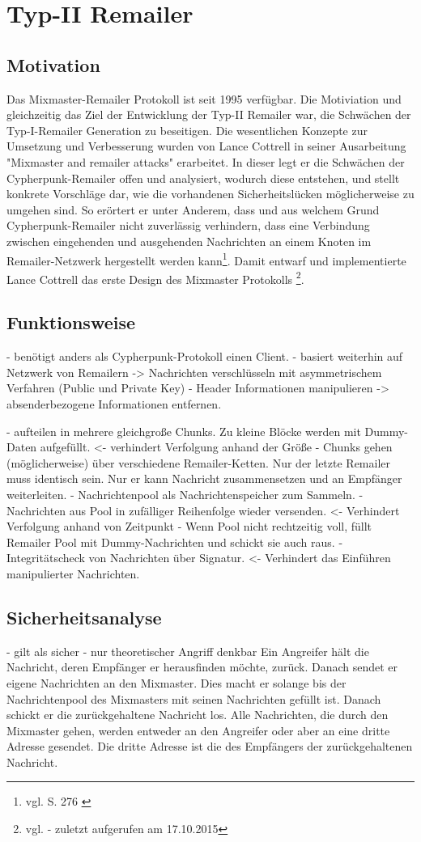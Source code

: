 \chapter{Typ-II Remailer}
\section{Motivation}
Das Mixmaster-Remailer Protokoll ist seit 1995 verfügbar. Die Motiviation und gleichzeitig das Ziel der Entwicklung der Typ-II Remailer war, die Schwächen der Typ-I-Remailer Generation zu beseitigen. Die wesentlichen Konzepte zur Umsetzung und Verbesserung wurden von Lance Cottrell in seiner Ausarbeitung "{}Mixmaster and remailer attacks"{} erarbeitet. In dieser legt er die Schwächen der Cypherpunk-Remailer offen und analysiert, wodurch diese entstehen, und stellt konkrete Vorschläge dar, wie die vorhandenen Sicherheitslücken möglicherweise zu umgehen sind. So erörtert er unter Anderem, dass und aus welchem Grund Cypherpunk-Remailer nicht zuverlässig verhindern, dass eine Verbindung zwischen eingehenden und ausgehenden Nachrichten an einem Knoten im Remailer-Netzwerk hergestellt werden kann\footnote{vgl. S. 276 \cite{oram2001peer}}. Damit entwarf und implementierte Lance Cottrell das erste Design des Mixmaster Protokolls \footnote{vgl. \cite{mixmastermanpage} - zuletzt aufgerufen am 17.10.2015}.

\section{Funktionsweise}
- benötigt anders als Cypherpunk-Protokoll einen Client.
- basiert weiterhin auf Netzwerk von Remailern -> Nachrichten verschlüsseln mit asymmetrischem Verfahren (Public und Private Key)
- Header Informationen manipulieren -> absenderbezogene Informationen entfernen.

- aufteilen in mehrere gleichgroße Chunks. Zu kleine Blöcke werden mit Dummy-Daten aufgefüllt. <- verhindert Verfolgung anhand der Größe
- Chunks gehen (möglicherweise) über verschiedene Remailer-Ketten. Nur der letzte Remailer muss identisch sein. Nur er kann Nachricht zusammensetzen und an Empfänger weiterleiten.
- Nachrichtenpool als Nachrichtenspeicher zum Sammeln.
- Nachrichten aus Pool in zufälliger Reihenfolge wieder versenden. <- Verhindert Verfolgung anhand von Zeitpunkt
- Wenn Pool nicht rechtzeitig voll, füllt Remailer Pool mit Dummy-Nachrichten und schickt sie auch raus.
- Integritätscheck von Nachrichten über Signatur. <- Verhindert das Einführen manipulierter Nachrichten.

\section{Sicherheitsanalyse}
- gilt als sicher
- nur theoretischer Angriff denkbar
Ein Angreifer hält die Nachricht, deren Empfänger er herausfinden möchte, zurück. Danach sendet er eigene Nachrichten an den Mixmaster. Dies macht er solange bis der Nachrichtenpool des Mixmasters mit seinen Nachrichten gefüllt ist. Danach schickt er die zurückgehaltene Nachricht los. Alle Nachrichten, die durch den Mixmaster gehen, werden entweder an den Angreifer oder aber an eine dritte Adresse gesendet. Die dritte Adresse ist die des Empfängers der zurückgehaltenen Nachricht.